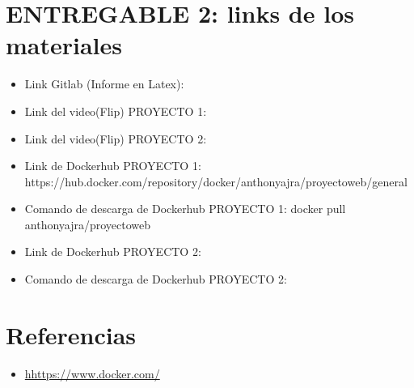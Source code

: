 \documentclass{article}
\begin{document}
\section{ENTREGABLE 2: links de los materiales}
    \begin{itemize}	
        \item Link Gitlab (Informe en Latex):
    \item Link del video(Flip) PROYECTO 1: 
    \item Link del video(Flip) PROYECTO 2: 
    \item Link de Dockerhub PROYECTO 1:  https://hub.docker.com/repository/docker/anthonyajra/proyectoweb/general
    \item Comando de descarga de Dockerhub PROYECTO 1:  docker pull anthonyajra/proyectoweb
    \item Link de Dockerhub PROYECTO 2:  
    \item Comando de descarga de Dockerhub PROYECTO 2:
\end{itemize}










   
\section{Referencias}
\begin{itemize}			
	\item \url{hhttps://www.docker.com/}
\end{itemize}	
	
%
%
%
			
\end{document}
